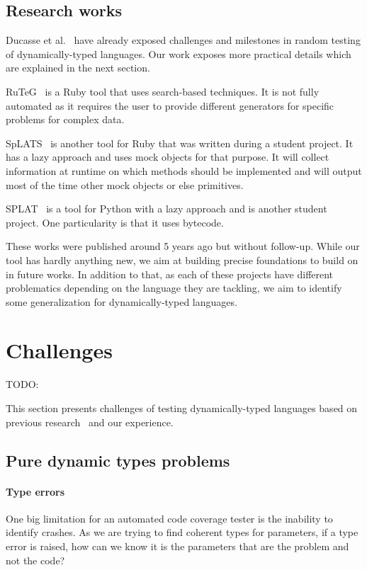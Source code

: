 \documentclass{llncs2e/llncs}
\def\todo#1{{\color{red}TODO:\quad#1}}
\begin{document}
\subsection{Research works}
\label{related_research}

Ducasse et al.~\cite{ducasse2011challenges} have already exposed challenges and
milestones in random testing of dynamically-typed languages. Our work exposes
more practical details which are explained in the next section.

RuTeG~\cite{mairhofer2011search} is a Ruby tool that uses search-based
techniques. It is not fully automated as it requires the user to provide
different generators for specific problems for complex data.

SpLATS~\cite{splats} is another tool for Ruby that was written during a student
project. It has a lazy approach and uses mock objects for that purpose. It will
collect information at runtime on which methods should be implemented and will
output most of the time other mock objects or else primitives.

SPLAT~\cite{splat} is a tool for Python with a lazy approach and is another
student project. One particularity is that it uses bytecode.

These works were published around 5 years ago but without follow-up. While our
tool has hardly anything new, we aim at building precise foundations to build on
in future works. In addition to that, as each of these projects have different
problematics depending on the language they are tackling, we aim to identify
some generalization for dynamically-typed languages.



\section{Challenges}
\label{challenges}
\todo{}

This section presents challenges of testing dynamically-typed languages based on
previous research~\cite{ducasse2011challenges} and our experience.

\subsection{Pure dynamic types problems}
\paragraph{Type errors} One big limitation for an automated code coverage tester
is the inability to identify crashes. As we are trying to find coherent types
for parameters, if a type error is raised, how can we know it is the parameters
that are the problem and not the code?
\end{document}
